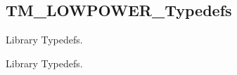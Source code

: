 \hypertarget{group___t_m___l_o_w_p_o_w_e_r___typedefs}{}\subsection{T\+M\+\_\+\+L\+O\+W\+P\+O\+W\+E\+R\+\_\+\+Typedefs}
\label{group___t_m___l_o_w_p_o_w_e_r___typedefs}


Library Typedefs.  


Library Typedefs. 

